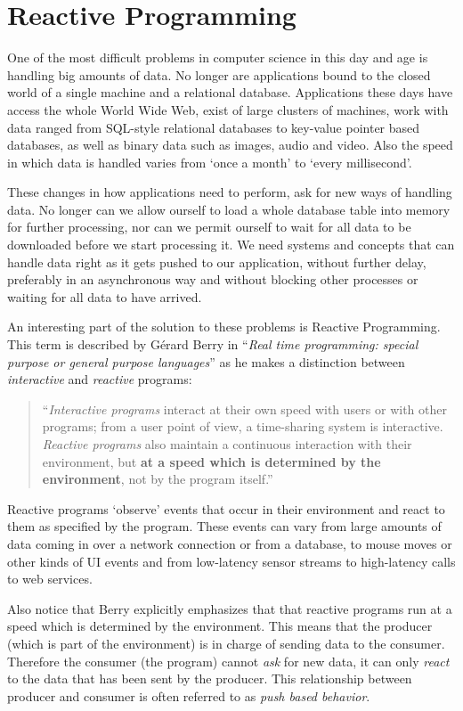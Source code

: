 \section{Reactive Programming}
One of the most difficult problems in computer science in this day and age is handling big amounts of data. No longer are applications bound to the closed world of a single machine and a relational database. Applications these days have access the whole World Wide Web, exist of large clusters of machines, work with data ranged from SQL-style relational databases to key-value pointer based databases, as well as binary data such as images, audio and video. Also the speed in which data is handled varies from `once a month' to `every millisecond'.

These changes in how applications need to perform, ask for new ways of handling data. No longer can we allow ourself to load a whole database table into memory for further processing, nor can we permit ourself to wait for all data to be downloaded before we start processing it. We need systems and concepts that can handle data right as it gets pushed to our application, without further delay, preferably in an asynchronous way and without blocking other processes or waiting for all data to have arrived. \cite{meijer2012-YMIAD}

An interesting part of the solution to these problems is Reactive Programming. This term is described by G\'erard Berry in ``\textit{Real time programming: special purpose or general purpose languages}'' \cite{berry1991-Reactive} as he makes a distinction between \textit{interactive} and \textit{reactive} programs:

\begin{quote}
``\textit{Interactive programs} interact at their own speed with users or with other programs; from a user point of view, a time-sharing system is interactive. \textit{Reactive programs} also maintain a continuous interaction with their environment, but \textbf{at a speed which is determined by the environment}, not by the program itself.''
\end{quote}

Reactive programs `observe' events that occur in their environment and react to them as specified by the program. These events can vary from large amounts of data coming in over a network connection or from a database, to mouse moves or other kinds of UI events and from low-latency sensor streams to high-latency calls to web services.

Also notice that Berry explicitly emphasizes that that reactive programs run at a speed which is determined by the environment. This means that the producer (which is part of the environment) is in charge of sending data to the consumer. Therefore the consumer (the program) cannot \emph{ask} for new data, it can only \emph{react} to the data that has been sent by the producer. This relationship between producer and consumer is often referred to as \textit{push based behavior}.

